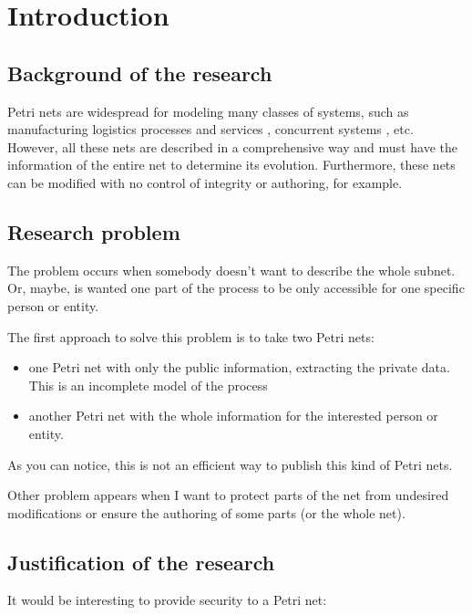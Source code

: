 
\chapter{Introduction} %

\label{Chapter1} %



\section{Background of the research}
Petri nets are widespread for modeling many
classes of systems, such as manufacturing logistics processes and services
\citep{SM-Jimenez2004143,SM-Guasch2002}, concurrent systems \citep{EPN-Jensen2009},
etc. However, all these nets are described in a comprehensive way and must have the information of the entire net to determine
its evolution.
Furthermore, these nets can be modified with no control of integrity or authoring,
for example. 
\section{Research problem}
The problem occurs when somebody doesn't want to describe the whole subnet.
Or, maybe, is wanted one part of the process to be only accessible for one
specific person or entity.


The first approach to solve this problem is to
take two Petri nets:


\begin{itemize}
\item
one Petri net with only the public information, extracting the private data. This
is an incomplete model of the process
\item
another Petri net with the whole information
for the interested person or entity.

\end{itemize}  

As you can notice, this is not an efficient way to publish this kind of Petri
nets.

Other problem appears when I want to protect parts of the net from undesired
modifications or ensure the authoring of some parts (or the whole net).


\section{Justification of the research}
It would be interesting to provide security to a Petri net:


